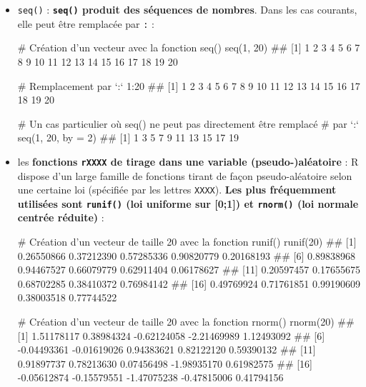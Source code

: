 \documentclass[12pt,twosided, notitlepage]{book}
\newenvironment{Shaded}{}{}
\newcommand{\KeywordTok}[1]{\textcolor[rgb]{0.00,0.00,1.00}{#1}}
\newcommand{\DataTypeTok}[1]{#1}
\newcommand{\DecValTok}[1]{#1}
\newcommand{\CommentTok}[1]{\textcolor[rgb]{0.00,0.50,0.00}{#1}}
\newcommand{\OperatorTok}[1]{#1}
\newcommand{\NormalTok}[1]{#1}
\renewenvironment{Shaded}{\begin{snugshade}}{\end{snugshade}}
\begin{document}
\begin{itemize}
\item
  \texttt{seq()} : \textbf{\texttt{seq()}
  produit des séquences de nombres}. Dans les cas courants, elle peut
  être remplacée par \texttt{:} :

\begin{Shaded}
\begin{Highlighting}[]
\CommentTok{# Création d'un vecteur avec la fonction seq()}
\KeywordTok{seq}\NormalTok{(}\DecValTok{1}\NormalTok{, }\DecValTok{20}\NormalTok{)}
\NormalTok{  ##  [1]  1  2  3  4  5  6  7  8  9 10 11 12 13 14 15 16 17 18 19 20}

\CommentTok{# Remplacement par `:`}
\DecValTok{1}\OperatorTok{:}\DecValTok{20}
\NormalTok{  ##  [1]  1  2  3  4  5  6  7  8  9 10 11 12 13 14 15 16 17 18 19 20}

\CommentTok{# Un cas particulier où seq() ne peut pas directement être remplacé}
\CommentTok{# par `:`}
\KeywordTok{seq}\NormalTok{(}\DecValTok{1}\NormalTok{, }\DecValTok{20}\NormalTok{, }\DataTypeTok{by =} \DecValTok{2}\NormalTok{)}
\NormalTok{  ##  [1]  1  3  5  7  9 11 13 15 17 19}
\end{Highlighting}
\end{Shaded}
\item
  les \textbf{fonctions \texttt{rXXXX} de tirage dans une variable
  (pseudo-)aléatoire} : R dispose d'un large famille de fonctions tirant
  de façon pseudo-aléatoire selon une certaine loi (spécifiée par les
  lettres \texttt{XXXX}). \textbf{Les plus fréquemment utilisées sont
  \texttt{runif()} (loi uniforme sur {[}0;1{]}) et \texttt{rnorm()} (loi
  normale centrée
  réduite)} :

\begin{Shaded}
\begin{Highlighting}[]
\CommentTok{# Création d'un vecteur de taille 20 avec la fonction runif()}
\KeywordTok{runif}\NormalTok{(}\DecValTok{20}\NormalTok{)}
\NormalTok{  ##  [1] 0.26550866 0.37212390 0.57285336 0.90820779 0.20168193}
\NormalTok{  ##  [6] 0.89838968 0.94467527 0.66079779 0.62911404 0.06178627}
\NormalTok{  ## [11] 0.20597457 0.17655675 0.68702285 0.38410372 0.76984142}
\NormalTok{  ## [16] 0.49769924 0.71761851 0.99190609 0.38003518 0.77744522}

\CommentTok{# Création d'un vecteur de taille 20 avec la fonction rnorm()}
\KeywordTok{rnorm}\NormalTok{(}\DecValTok{20}\NormalTok{)}
\NormalTok{  ##  [1]  1.51178117  0.38984324 -0.62124058 -2.21469989  1.12493092}
\NormalTok{  ##  [6] -0.04493361 -0.01619026  0.94383621  0.82122120  0.59390132}
\NormalTok{  ## [11]  0.91897737  0.78213630  0.07456498 -1.98935170  0.61982575}
\NormalTok{  ## [16] -0.05612874 -0.15579551 -1.47075238 -0.47815006  0.41794156}
\end{Highlighting}
\end{Shaded}
\end{itemize}
\end{document}
